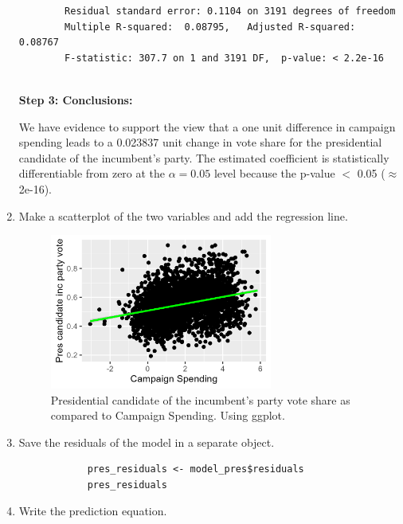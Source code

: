 \documentclass[12pt,letterpaper]{article}
\begin{document}
\begin{enumerate}
\begin{verbatim}
		Residual standard error: 0.1104 on 3191 degrees of freedom
		Multiple R-squared:  0.08795,	Adjusted R-squared:  0.08767 
		F-statistic: 307.7 on 1 and 3191 DF,  p-value: < 2.2e-16
	
		\end{verbatim}
		
		\textbf{Step 3: Conclusions:}
		
		We have evidence to support the view that a one unit difference in campaign spending leads to a 0.023837 unit change in vote share for the presidential candidate of the incumbent's party. The estimated coefficient is statistically differentiable from zero at the $\alpha=0.05$ level because the p-value $<$ 0.05 ($\approx $2e-16). \\
		
		
		\item Make a scatterplot of the two variables and add the regression line. 	
		
		  
		
		\begin{figure}[h!]
			\centering
			\caption{\footnotesize Presidential candidate of the incumbent's party vote share as compared to Campaign Spending. Using ggplot.}
			\includegraphics[width=0.69\textwidth]{vote_share_pres_scatter.png}
			
		\end{figure} 
				
		\newpage
		
		\item Save the residuals of the model in a separate object.	
		
		\begin{verbatim}
			pres_residuals <- model_pres$residuals
			pres_residuals
		\end{verbatim}
		
		
		\item Write the prediction equation.
		
		\end{enumerate}		
		
\end{document}
